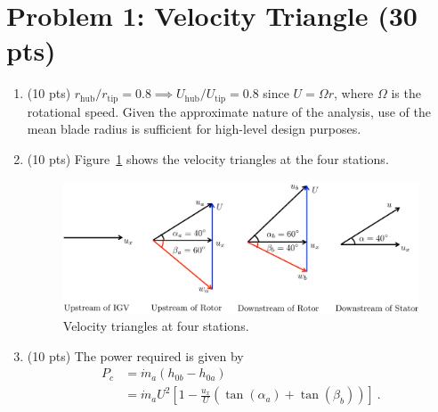 \documentclass[12pt]{article}
\begin{document}
\begin{titlepage}
\vfill %

\end{titlepage}


\section{Problem 1: Velocity Triangle (30 pts)}
	\begin{enumerate}[label=(\alph*)]
		\item (10 pts)
			$r_\mathrm{hub}/r_\mathrm{tip}=0.8\implies U_\mathrm{hub}/U_\mathrm{tip}=0.8$ since $U=\Omega r$, where $\Omega$ is the rotational speed. Given the approximate nature of the analysis, use of the mean blade radius is sufficient for high-level design purposes.
		\item (10 pts)
			Figure~\ref{FIG_1B} shows the velocity triangles at the four stations.
			\begin{figure}[!ht!]
				\begin{center}
					\includegraphics[width=160mm]{problem1b.pdf}
					\caption{\label{FIG_1B} Velocity triangles at four stations.}
				\end{center}
			\end{figure}
		\item (10 pts)
			The power required is given by
			\begin{equation}
				\begin{aligned}
					P_c &= \dot{m}_a(h_{0b}-h_{0a})\\
					&= \dot{m}_aU^2\left[1-\frac{u_x}{U}(\tan(\alpha_a)+\tan(\beta_b))\right] \ .
				\end{aligned}
			\end{equation}
			

\end{enumerate}
\end{document}
